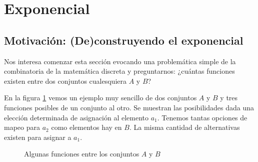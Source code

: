 \section{Exponencial}\label{cons:exp}

\subsection{Motivación: (De)construyendo el exponencial}

Nos interesa comenzar esta sección evocando una problemática simple de la combinatoria de la matemática discreta y preguntarnos: ¿cuántas funciones existen entre dos conjuntos cualesquiera $A$ y $B$?

En la figura \ref{fig:funciones} vemos un ejemplo muy sencillo de dos conjuntos $A$ y $B$ y tres funciones posibles de un conjunto al otro. Se muestran las posibilidades dada una elección determinada de asignación al elemento $a_1$. Tenemos tantas opciones de mapeo para $a_2$ como elementos hay en $B$. La misma cantidad de alternativas existen para asignar a $a_1$.


\begin{figure}[H] 
\begin{center}
  \xymatrixcolsep{0.5pc} \xymatrixrowsep{2pc}
  \centerline{
  \quad
    \quad
  }
\label{fig:funciones}
\end{center}
\caption{Algunas funciones entre los conjuntos $A$ y $B$ }
\end{figure}

